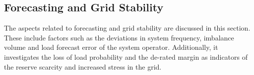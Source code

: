 \documentclass[energies,article,submit,moreauthors,pdftex]{Definitions/mdpi}
\begin{document}



\subsection{Forecasting and Grid Stability}
The aspects related to forecasting and grid stability are discussed in this section. These include factors such as the deviations in system frequency, imbalance volume and load forecast error of the system operator. Additionally, it investigates the loss of load probability and the de-rated margin as indicators of the reserve scarcity and increased stress in the grid.
\end{document}
